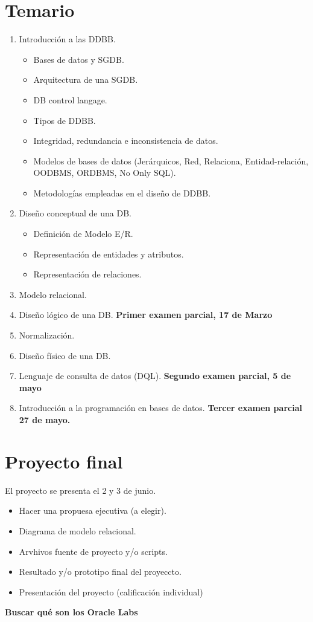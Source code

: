\section{Temario}
\begin{enumerate}
	\item Introducci\'{o}n a las DDBB.
		\begin{itemize}
			\item Bases de datos y SGDB.
			\item Arquitectura de una SGDB.
			\item DB control langage.
			\item Tipos de DDBB.
			\item Integridad, redundancia e inconsistencia de datos.
			\item Modelos de bases de datos (Jer\'{a}rquicos, Red, Relaciona, Entidad-relaci\'{o}n, OODBMS, ORDBMS, No Only SQL).
			\item Metodolog\'{i}as empleadas en el dise\~{n}o de DDBB.
		\end{itemize}
	\item Dise\~{n}o conceptual de una DB.
		\begin{itemize}
			\item Definici\'{o}n de Modelo E/R.
			\item Representaci\'{o}n de entidades y atributos.
			\item Representaci\'{o}n de relaciones.
		\end{itemize}
	\item Modelo relacional.
	\item Dise\~{n}o l\'{o}gico de una DB.
		\textbf{Primer examen parcial, 17 de Marzo}
	\item Normalizaci\'{o}n.
	\item Dise\~{n}o f\'{i}sico de una DB.
	\item Lenguaje de consulta de datos (DQL).
		\textbf{Segundo examen parcial, 5 de mayo}
	\item Introducci\'{o}n a la programaci\'{o}n en bases de datos.
		\textbf{Tercer examen parcial 27 de mayo.}
\end{enumerate}

\section{Proyecto final}
El proyecto se presenta el 2 y 3 de junio.\\
\begin{itemize}
	\item Hacer una propuesa ejecutiva (a elegir).
	\item Diagrama de modelo relacional.
	\item Arvhivos fuente de proyecto y/o scripts.
	\item Resultado y/o prototipo final del proyeccto.
	\item Presentaci\'{o}n del proyecto (calificaci\'{o}n individual)
\end{itemize}
\textbf{Buscar qu\'{e} son los Oracle Labs}

